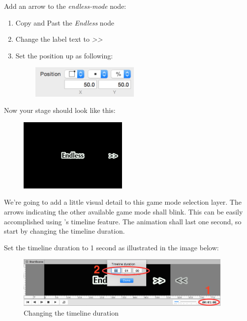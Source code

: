 \begin{leftbar}
Add an arrow to the \textit{endless-mode} node:
\begin{enumerate}
  \item Copy and Past the \textit{Endless} node
  \item Change the label text to \textit{>>}
  \item Set the position up as following: \begin{figure}[H]
										  \centering
										  \includegraphics[width=150pt]{images/Chapter7/arrow_label_position.png}
										  \end{figure}
\end{enumerate}
\end{leftbar}

Now your stage should look like this:
\begin{figure}[H]
\centering
\includegraphics[width=150pt]{images/Chapter7/endless_mode.png}
\end{figure}
We're going to add a little visual detail to this game mode selection layer. The
arrows indicating the other available game mode shall blink. This can be easily
accomplished using \SB{}'s timeline feature. The animation shall last one
second, so start by changing the timeline duration.

\begin{leftbar}
Set the timeline duration to 1 second as illustrated in the image below: 
\begin{figure}[H]
\centering
\includegraphics[width=300pt]{images/Chapter7/timeline_duration.png}
\caption{Changing the timeline duration}\label{fig:
timeline_duration}
\end{figure}
\end{leftbar}


